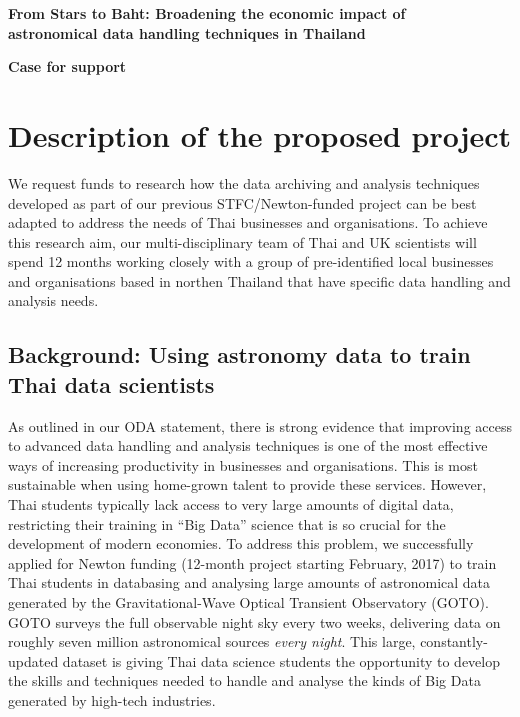 \documentclass[11pt]{article}
\begin{document}
\setcounter{figure}{0}
\noindent
{\LARGE \bf From Stars to Baht: Broadening the economic impact of \\
astronomical data handling techniques in Thailand}

\vspace{3mm}

\noindent
{\LARGE \bf Case for support}
\vspace{-3mm}
\section{Description of the proposed project}
\noindent
We request funds to research how the data archiving and analysis techniques developed as part of our previous STFC/Newton-funded project can be best adapted to address the needs of Thai businesses and organisations. To achieve this research aim, our multi-disciplinary team of Thai and UK scientists will spend 12 months working closely with a group of pre-identified local businesses and organisations based in northen Thailand that have specific data handling and analysis needs.

\subsection{Background: Using astronomy data to train Thai data scientists}
As outlined in our ODA statement, there is strong evidence that improving access to advanced data handling and analysis techniques is one of the most effective ways of increasing productivity in businesses and organisations. This is most sustainable when using home-grown talent to provide these services. However, Thai students typically lack access to very large amounts of digital data, restricting their training in ``Big Data'' science that is so crucial for the development of modern economies. To address this problem, we successfully applied for Newton funding (12-month project starting February, 2017) to train Thai students in databasing and analysing large amounts of astronomical data generated by the Gravitational-Wave Optical Transient Observatory (GOTO). GOTO surveys the full observable night sky every two weeks, delivering data on roughly seven million astronomical sources {\it every night}. This large, constantly-updated dataset is giving Thai data science students the opportunity to develop the skills and techniques needed to handle and analyse the kinds of Big Data generated by high-tech industries.
\end{document}
